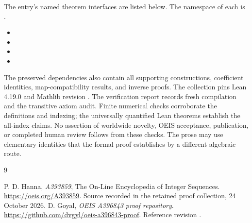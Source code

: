 \documentclass[11pt,a4paper]{article}
\theoremstyle{remark}\newtheorem{remark}[theorem]{Remark}
\begin{document}
The entry's named theorem interfaces are listed below. The namespace of
each is .
\begin{itemize}[leftmargin=1.5em,itemsep=1pt]
\item {}
\item {}
\item {}
\item {}
\end{itemize}
The preserved dependencies also contain all supporting constructions,
coefficient identities, map-compatibility results, and inverse proofs.
The collection pins Lean 4.19.0 and Mathlib revision
.
The verification report records fresh compilation and the transitive axiom
audit. Finite numerical checks corroborate the definitions and indexing;
the universally quantified Lean theorems establish the all-index claims.
No assertion of worldwide novelty, OEIS acceptance, publication, or completed
human review follows from these checks. The prose may use elementary
identities that the formal proof establishes by a different algebraic route.

\begin{thebibliography}{9}\raggedright
{} P. D. Hanna, \emph{A393859}, The On-Line Encyclopedia of Integer
Sequences. \url{https://oeis.org/A393859}. Source recorded in the retained
proof collection, 24 October 2026.
 D. Goyal, \emph{OEIS A396843 proof repository}.
\url{https://github.com/dvgyl/oeis-a396843-proof}.
Reference revision .
\end{thebibliography}
\end{document}
